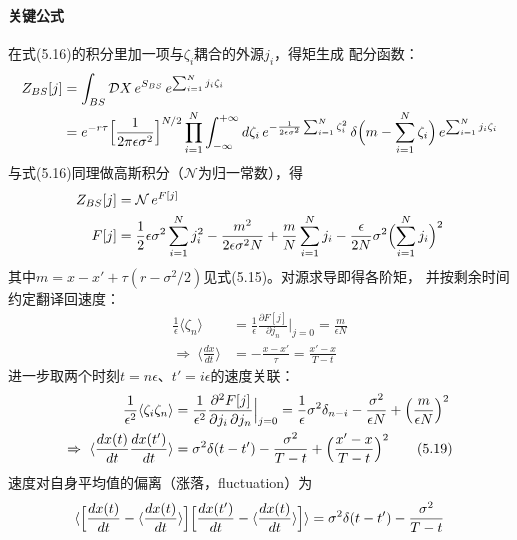 \paragraph{关键公式}
在式(5.16)的积分里加一项与$\zeta_{i}$耦合的外源$j_{i}$，得矩生成
配分函数：
\begin{align*}
Z_{BS}[j]&=\int_{BS}\mathcal{D}X\,e^{S_{BS}}\,e^{\sum_{i=1}^{N}j_{i}\zeta_{i}}\\
&=e^{-r\tau}\Bigl[\frac{1}{2\pi\epsilon\sigma^{2}}\Bigr]^{N/2}
\prod_{i=1}^{N}\int_{-\infty}^{+\infty}d\zeta_{i}\,
e^{-\frac{1}{2\epsilon\sigma^{2}}\sum_{i=1}^{N}\zeta_{i}^{2}}\,
\delta\Bigl(m-\sum_{i=1}^{N}\zeta_{i}\Bigr)\,
e^{\sum_{i=1}^{N}j_{i}\zeta_{i}}
\end{align*}
与式(5.16)同理做高斯积分（$\mathcal{N}$为归一常数），得
\begin{align*}
Z_{BS}[j]&=\mathcal{N}\,e^{F[j]}\\
F[j]&=\frac{1}{2}\epsilon\sigma^{2}\sum_{i=1}^{N}j_{i}^{2}
-\frac{m^{2}}{2\epsilon\sigma^{2}N}
+\frac{m}{N}\sum_{i=1}^{N}j_{i}
-\frac{\epsilon}{2N}\sigma^{2}\Bigl(\sum_{i=1}^{N}j_{i}\Bigr)^{2}
\end{align*}
其中$m=x-x'+\tau(r-\sigma^{2}/2)$见式(5.15)。对源求导即得各阶矩，
并按剩余时间约定翻译回速度：
\begin{align*}
\frac{1}{\epsilon}\langle\zeta_{n}\rangle
&=\frac{1}{\epsilon}\frac{\partial F[j]}{\partial j_{n}}\Big|_{j=0}
=\frac{m}{\epsilon N}\\
\Rightarrow\ \langle\frac{dx}{dt}\rangle
&=-\frac{x-x'}{\tau}=\frac{x'-x}{T-t}
\tag{5.18}
\end{align*}
进一步取两个时刻$t=n\epsilon$、$t'=i\epsilon$的速度关联：
\begin{align*}
\frac{1}{\epsilon^{2}}\langle\zeta_{i}\zeta_{n}\rangle
&=\frac{1}{\epsilon^{2}}\frac{\partial^{2}F[j]}{\partial j_{i}\,\partial j_{n}}\Big|_{j=0}
=\frac{1}{\epsilon}\sigma^{2}\delta_{n-i}-\frac{\sigma^{2}}{\epsilon N}
+\Bigl(\frac{m}{\epsilon N}\Bigr)^{2}\\
\Rightarrow\ \langle\frac{dx(t)}{dt}\frac{dx(t')}{dt}\rangle
&=\sigma^{2}\delta(t-t')-\frac{\sigma^{2}}{T-t}
+\Bigl(\frac{x'-x}{T-t}\Bigr)^{2}
\tag{5.19}
\end{align*}
速度对自身平均值的偏离（涨落，fluctuation）为
\begin{equation*}
\langle\Bigl[\frac{dx(t)}{dt}-\langle\frac{dx(t)}{dt}\rangle\Bigr]
\Bigl[\frac{dx(t')}{dt}-\langle\frac{dx(t)}{dt}\rangle\Bigr]\rangle
=\sigma^{2}\delta(t-t')-\frac{\sigma^{2}}{T-t}
\end{equation*}

